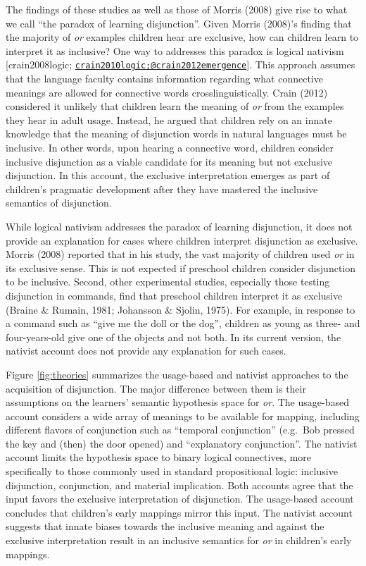 \documentclass[,man,floatsintext]{apa6}
\begin{document}
The findings of these studies as well as those of Morris (2008) give rise to what we call \enquote{the paradox of learning disjunction}. Given Morris (2008)'s finding that the majority of \emph{or} examples children hear are exclusive, how can children learn to interpret it as inclusive? One way to addresses this paradox is logical nativism {[}crain2008logic; \href{mailto:crain2010logic;@crain2012emergence}{\nolinkurl{crain2010logic;@crain2012emergence}}{]}. This approach assumes that the language faculty contains information regarding what connective meanings are allowed for connective words crosslinguistically. Crain (2012) considered it unlikely that children learn the meaning of \emph{or} from the examples they hear in adult usage. Instead, he argued that children rely on an innate knowledge that the meaning of disjunction words in natural languages must be inclusive. In other words, upon hearing a connective word, children consider inclusive disjunction as a viable candidate for its meaning but not exclusive disjunction. In this account, the exclusive interpretation emerges as part of children's pragmatic development after they have mastered the inclusive semantics of disjunction.

While logical nativism addresses the paradox of learning disjunction, it does not provide an explanation for cases where children interpret disjunction as exclusive. Morris (2008) reported that in his study, the vast majority of children used \emph{or} in its exclusive sense. This is not expected if preschool children consider disjunction to be inclusive. Second, other experimental studies, especially those testing disjunction in commands, find that preschool children interpret it as exclusive (Braine \& Rumain, 1981; Johansson \& Sjolin, 1975). For example, in response to a command such as \enquote{give me the doll or the dog}, children as young as three- and four-years-old give one of the objects and not both. In its current version, the nativist account does not provide any explanation for such cases.

Figure \ref{fig:theories} summarizes the usage-based and nativist approaches to the acquisition of disjunction. The major difference between them is their assumptions on the learners' semantic hypothesis space for \emph{or}. The usage-based account considers a wide array of meanings to be available for mapping, including different flavors of conjunction such as \enquote{temporal conjunction} (e.g.~Bob pressed the key and (then) the door opened) and \enquote{explanatory conjunction}. The nativist account limits the hypothesis space to binary logical connectives, more specifically to those commonly used in standard propositional logic: inclusive disjunction, conjunction, and material implication. Both accounts agree that the input favors the exclusive interpretation of disjunction. The usage-based account concludes that children's early mappings mirror this input. The nativist account suggests that innate biases towards the inclusive meaning and against the exclusive interpretation result in an inclusive semantics for \emph{or} in children's early mappings.
\end{document}
